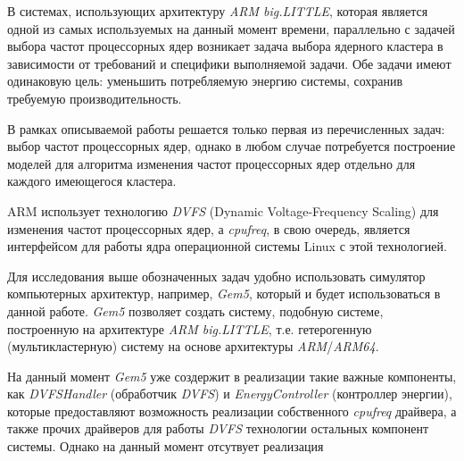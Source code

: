 В системах, использующих архитектуру \textit{ARM big.LITTLE}, которая является одной из самых
используемых на данный момент времени, параллельно с задачей выбора частот процессорных ядер
возникает задача выбора ядерного кластера в зависимости от требований и специфики выполняемой
задачи. Обе задачи имеют одинаковую цель: уменьшить потребляемую энергию системы, сохранив
требуемую производительность.

В рамках описываемой работы решается только первая из перечисленных задач: выбор частот
процессорных ядер, однако в любом случае потребуется построение моделей для алгоритма
изменения частот процессорных ядер отдельно для каждого имеющегося кластера.

ARM использует технологию \textit{DVFS} (Dynamic Voltage-Frequency Scaling) для изменения
частот процессорных ядер, а \textit{cpufreq}, в свою очередь, является интерфейсом
для работы ядра операционной системы Linux с этой технологией.

Для исследования выше обозначенных задач удобно использовать симулятор компьютерных
архитектур, например, \textit{Gem5}, который и будет использоваться в данной работе.
\textit{Gem5} позволяет создать систему, подобную системе, построенную на архитектуре
\textit{ARM big.LITTLE}, т.е. гетерогенную (мультикластерную) систему на основе
архитектуры \textit{ARM}/\textit{ARM64}.

На данный момент \textit{Gem5} уже создержит в реализации такие важные компоненты,
как \textit{DVFSHandler} (обработчик \textit{DVFS}) и \textit{EnergyController}
(контроллер энергии), которые предоставляют возможность реализации собственного
\textit{cpufreq} драйвера, а также прочих драйверов для работы \textit{DVFS} технологии
остальных компонент системы. Однако на данный момент отсутвует реализация

\newpage
